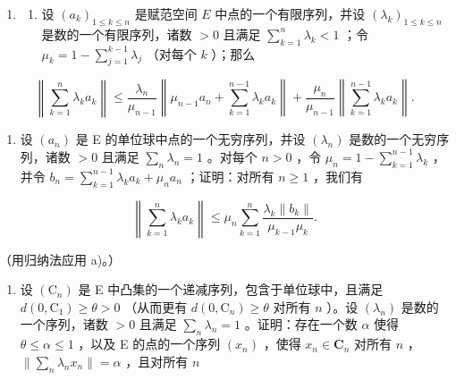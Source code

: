 \begin{enumerate}
\def\labelenumi{\arabic{enumi})}
\setcounter{enumi}{23}
\tightlist
\item
  \begin{enumerate}
  \def\labelenumii{\alph{enumii})}
  \tightlist
  \item
    设 \((a_{k})_{1\leqslant k\leqslant n}\) 是赋范空间 \(E\) 中点的一个有限序列，并设 \((\lambda_k)_{1\leqslant k\leqslant n}\) 是数的一个有限序列，诸数 \(>0\) 且满足 \(\sum_{k = 1}^{n}\lambda_{k} < 1\) ；令 \(\mu_{k} = 1 - \sum_{j = 1}^{k - 1}\lambda_{j}\) （对每个 \(k\) ）；那么
  \end{enumerate}
\end{enumerate}

\[
\left\| \sum_ {k = 1} ^ {n} \lambda_ {k} a _ {k} \right\| \leqslant \frac {\lambda_ {n}}{\mu_ {n - 1}} \left\| \mu_ {n - 1} a _ {n} + \sum_ {k = 1} ^ {n - 1} \lambda_ {k} a _ {k} \right\| + \frac {\mu_ {n}}{\mu_ {n - 1}} \left\| \sum_ {k = 1} ^ {n - 1} \lambda_ {k} a _ {k} \right\|.
\]

\begin{enumerate}
\def\labelenumi{\alph{enumi})}
\setcounter{enumi}{1}
\tightlist
\item
  设 \((a_{n})\) 是 E 的单位球中点的一个无穷序列，并设 \((\lambda_{n})\) 是数的一个无穷序列，诸数 \(>0\) 且满足 \(\sum_{n} \lambda_{n} = 1\) 。对每个 \(n > 0\) ，令 \(\mu_{n} = 1 - \sum_{k=1}^{n-1} \lambda_{k}\) ，并令 \(b_{n} = \sum_{k=1}^{n-1} \lambda_{k} a_{k} + \mu_{n} a_{n}\) ；证明：对所有 \(n \geqslant 1\) ，我们有
\end{enumerate}

\[
\left\| \sum_ {k = 1} ^ {n} \lambda_ {k} a _ {k} \right\| \leqslant \mu_ {n} \sum_ {k = 1} ^ {n} \frac {\lambda_ {k} \| b _ {k} \|}{\mu_ {k - 1} \mu_ {k}}.
\]

（用归纳法应用 a)。）

\begin{enumerate}
\def\labelenumi{\alph{enumi})}
\setcounter{enumi}{2}
\tightlist
\item
  设 \((\mathrm{C}_n)\) 是 E 中凸集的一个递减序列，包含于单位球中，且满足 \(d(0,\mathrm{C}_1)\geqslant \theta >0\) （从而更有 \(d(0,\mathrm{C}_n)\geqslant \theta\) 对所有 \(n\) ）。设 \((\lambda_{n})\) 是数的一个序列，诸数 \(>0\) 且满足 \(\sum_{n}\lambda_{n} = 1\) 。证明：存在一个数 \(\alpha\) 使得 \(\theta \leqslant \alpha \leqslant 1\) ，以及 E 的点的一个序列 \((x_{n})\) ，使得 \(x_{n}\in \mathbf{C}_{n}\) 对所有 \(n\) ，\(\| \sum_{n}\lambda_{n}x_{n}\| = \alpha\) ，且对所有 \(n\)
\end{enumerate}


